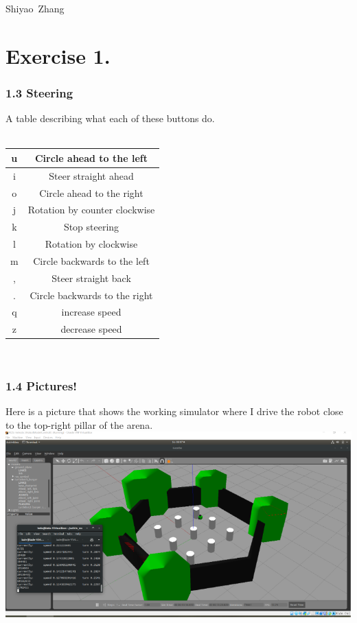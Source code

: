 \documentclass{ROS}
\begin{document}

          {Shiyao~Zhang}{}

\section*{Exercise 1.} 
\subsubsection*{1.3 Steering}
A table describing what each of these buttons do.\\
\\
\begin{tabular}{|c|c|}
\hline
u&Circle ahead to the left\\
\hline
i&Steer straight ahead\\
\hline
o&Circle ahead to the right\\
\hline
j&Rotation by counter clockwise\\
\hline
k&Stop steering\\
\hline
l&Rotation by clockwise\\
\hline
m&Circle backwards to the left\\
\hline
,&Steer straight back\\
\hline
.&Circle backwards to the right\\
\hline
q&increase speed\\
\hline
z&decrease speed\\
\hline
\end{tabular}
\\
\subsubsection*{1.4 Pictures!}
Here is a picture that shows the working simulator where I drive the robot close to the top-right pillar of the arena.\\
\includegraphics{Screenshot1.png}
\\
\end{document}
